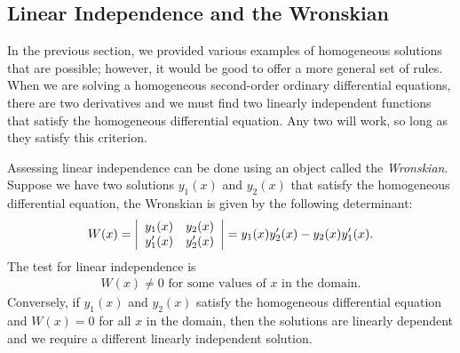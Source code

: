 \subsection{Linear Independence and the Wronskian}

In the previous section, we provided various examples of homogeneous solutions that are possible; however, it would be good to offer a more general set of rules. When we are solving a homogeneous second-order ordinary differential equations, there are two derivatives and we must find two linearly independent functions that satisfy the homogeneous differential equation. Any two will work, so long as they satisfy this criterion.

Assessing linear independence can be done using an object called the \emph{Wronskian}. Suppose we have two solutions $y_1(x)$ and $y_2(x)$ that satisfy the homogeneous differential equation, the Wronskian is given by the following determinant:
\begin{align}
  W(x) = \left| \begin{array}{r r}
  y_1(x)  & y_2(x)   \\
  y_1'(x) & y_2'(x)  \\ \end{array} \right| = y_1(x) y_2'(x) - y_2(x) y_1'(x).
\end{align}
The test for linear independence is
\begin{align}
  W(x) \ne 0 \text{ for some values of $x$ in the domain.}
\end{align}
Conversely, if $y_1(x)$ and $y_2(x)$ satisfy the homogeneous differential equation and $W(x) = 0$ for all $x$ in the domain, then the solutions are linearly dependent and we require a different linearly independent solution.

